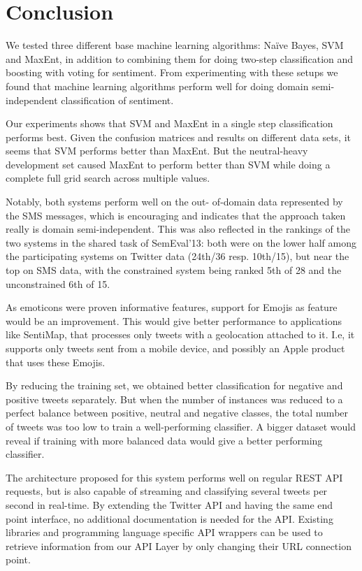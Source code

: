 \chapter{Conclusion}
We tested three different base machine learning algorithms: Na\"{i}ve Bayes, SVM and MaxEnt, in addition to combining them for doing two-step classification and boosting with voting for sentiment. From experimenting with these setups we found that machine learning algorithms perform well for doing domain semi-independent classification of sentiment.

Our experiments shows that SVM and MaxEnt in a single step classification performs best. Given the confusion matrices and results on different data sets, it seems that SVM performs better than MaxEnt. But the neutral-heavy development set caused MaxEnt to perform better than SVM while doing a complete full grid search across multiple values.

Notably, both systems perform well on the out- of-domain data represented by the SMS messages, which is encouraging and indicates that the approach taken really is domain semi-independent. This was also reflected in the rankings of the two systems in the shared task of SemEval'13: both were on the lower half among the participating systems on Twitter data (24th/36 resp. 10th/15), but near the top on SMS data, with the constrained system being ranked 5th of 28  and the unconstrained 6th of 15.

As emoticons were proven informative features, support for Emojis as feature would be an improvement. This would give better performance to applications like SentiMap, that processes only tweets with a geolocation attached to it. I.e, it supports only tweets sent from a mobile device, and possibly an Apple product that uses these Emojis.

By reducing the training set, we obtained better classification for negative and positive tweets separately. But when the number of instances was reduced to a perfect balance between positive, neutral and negative classes, the total number of tweets was too low to train a well-performing classifier. A bigger dataset would reveal if training with more balanced data would give a better performing classifier.

The architecture proposed for this system performs well on regular REST API requests, but is also capable of streaming and classifying several tweets per second in real-time. By extending the Twitter API and having the same end point interface, no additional documentation is needed for the API. Existing libraries and programming language specific API wrappers can be used to retrieve information from our API Layer by only changing their URL connection point. 

